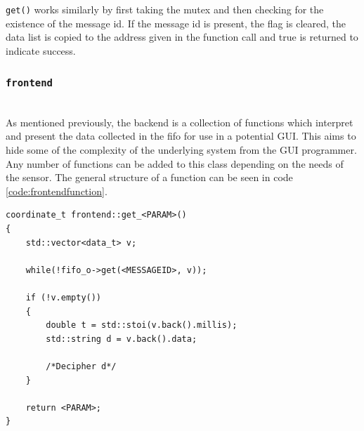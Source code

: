 \texttt{get()} works similarly by first taking the mutex and then checking for the existence of the message id.
If the message id is present, the flag is cleared, the data list is copied to the address given in the function call and true is returned to indicate success.

\subsubsection{\texttt{frontend}}~\\
As mentioned previously, the backend is a collection of functions which interpret and present the data collected in the fifo for use in a potential GUI.
This aims to hide some of the complexity of the underlying system from the GUI programmer.
Any number of functions can be added to this class depending on the needs of the sensor.
The general structure of a function can be seen in code \ref{code:frontendfunction}.

\begin{lstlisting}[caption=Function template for accesing data in fifo,label=code:frontendfunction]
coordinate_t frontend::get_<PARAM>()
{
	std::vector<data_t> v;

	while(!fifo_o->get(<MESSAGEID>, v));

	if (!v.empty())
	{
		double t = std::stoi(v.back().millis);
		std::string d = v.back().data;

		/*Decipher d*/
	}

	return <PARAM>;
}
\end{lstlisting}